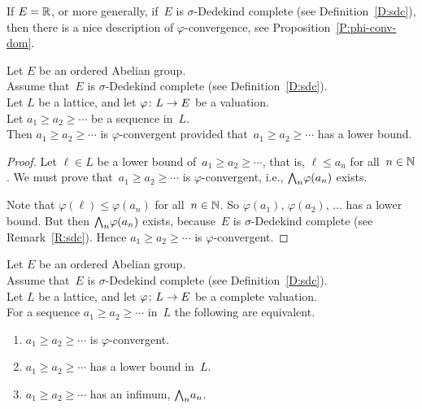 \documentclass[main.tex]{subfiles}
\begin{document}
%
%
\noindent
If $E=\mathbb{R}$,
or more generally,
if~$E$ is $\sigma$-Dedekind complete
(see Definition~\ref{D:sdc}),
then there is a nice description of $\varphi$-convergence,
see Proposition~\ref{P:phi-conv-dom}.
\begin{lem}
\label{L:phi-conv-dom}
Let $E$ be an ordered Abelian group.\\
Assume that~$E$ is $\sigma$-Dedekind complete
(see Definition~\ref{D:sdc}).\\
Let $L$ be a lattice,
and let $\varphi\colon L\rightarrow E$ be a valuation.\\
Let $a_1 \geq a_2 \geq \dotsb$ be a sequence in~$L$.\\
Then $a_1 \geq a_2 \geq \dotsb$ 
is $\varphi$-convergent 
provided that~$a_1\geq a_2\geq \dotsb$ 
has a lower bound.
\end{lem}
\begin{proof}
Let $\ell\in L$ be a lower bound of~$a_1 \geq a_2 \geq \dotsb$,
that is, $\ell \leq a_n$ for all~$n\in\mathbb{N}$.
We must prove that~$a_1 \geq a_2 \geq \dotsb$ is
$\varphi$-convergent,
i.e., $\textstyle{\bigwedge}_n \varphi(a_n)$ exists.

Note that $\varphi(\ell)\leq \varphi(a_n)$ for all~$n\in \mathbb{N}$.
So $\varphi(a_1),\,\varphi(a_2),\, \dotsc$
has a lower bound.
But then $\textstyle{\bigwedge}_n \varphi(a_n)$ exists,
because~$E$ is $\sigma$-Dedekind complete
(see Remark~\ref{R:sdc}).
Hence $a_1 \geq a_2 \geq \dotsb$ is $\varphi$-convergent.
\end{proof}
\begin{prop}
\label{P:phi-conv-dom}
Let $E$ be an ordered Abelian group.\\
Assume that~$E$ is $\sigma$-Dedekind complete
(see Definition~\ref{D:sdc}).\\
Let $L$ be a lattice,
and let $\varphi\colon L\rightarrow E$ be a complete valuation.\\
For a sequence $a_1 \geq a_2 \geq \dotsb$
in~$L$ the following are equivalent.
\begin{enumerate}
\item
\label{P:phi-conv-dom_i}
$a_1 \geq a_2 \geq \dotsb$
is $\varphi$-convergent.

\item
\label{P:phi-conv-dom_ii}
$a_1 \geq a_2 \geq \dotsb$
has a lower bound in~$L$.

\item
\label{P:phi-conv-dom_iii}
$a_1 \geq a_2 \geq \dotsb$
has an infimum, $\textstyle{\bigwedge}_n a_n$.
\end{enumerate}
\end{prop}
\end{document}
